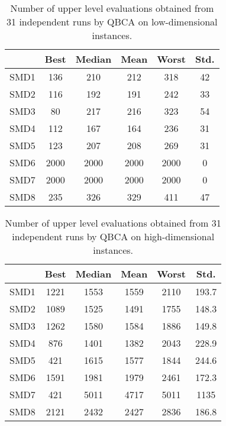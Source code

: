 \documentclass[conference]{IEEEtran}
\theoremstyle{definition}
\begin{document}
\begin{table}[htbp]
    \caption{Number of upper level evaluations obtained from 31 independent runs by
             QBCA on low-dimensional instances.}
    \label{tab:ul-evals-5}
    \centering
    \begin{tabular}{cccccc}
        \hline
             & Best &  Median &  Mean &  Worst &  Std. \\ \hline
        SMD1 & 136 & 210 & 212 & 318 & 42 \\ \hline 
        SMD2 & 116 & 192 & 191 & 242 & 33 \\ \hline 
        SMD3 & 80 & 217 & 216 & 323 & 54 \\ \hline 
        SMD4 & 112 & 167 & 164 & 236 & 31 \\ \hline 
        SMD5 & 123 & 207 & 208 & 269 & 31 \\ \hline 
        SMD6 & 2000 & 2000 & 2000 & 2000 & 0 \\ \hline 
        SMD7 & 2000 & 2000 & 2000 & 2000 & 0 \\ \hline 
        SMD8 & 235 & 326 & 329 & 411 & 47 \\ \hline 
    \end{tabular}
\end{table}
% 
\begin{table}[htbp]
    \caption{Number of upper level evaluations obtained from 31 independent runs
             by QBCA on high-dimensional instances.}
    \label{tab:ul-evals}
    \centering
    \begin{tabular}{cccccc}
        \hline
        & Best &  Median &  Mean &  Worst &  Std. \\ \hline
        SMD1 & 1221 & 1553 & 1559 & 2110 & 193.7 \\ \hline 
        SMD2 & 1089 & 1525 & 1491 & 1755 & 148.3 \\ \hline 
        SMD3 & 1262 & 1580 & 1584 & 1886 & 149.8 \\ \hline 
        SMD4 & 876 & 1401 & 1382 & 2043 & 228.9 \\ \hline 
        SMD5 & 421 & 1615 & 1577 & 1844 & 244.6 \\ \hline 
        SMD6 & 1591 & 1981 & 1979 & 2461 & 172.3 \\ \hline 
        SMD7 & 421 & 5011 & 4717 & 5011 & 1135 \\ \hline 
        SMD8 & 2121 & 2432 & 2427 & 2836 & 186.8 \\ \hline 
    \end{tabular}
\end{table}
\end{document}
